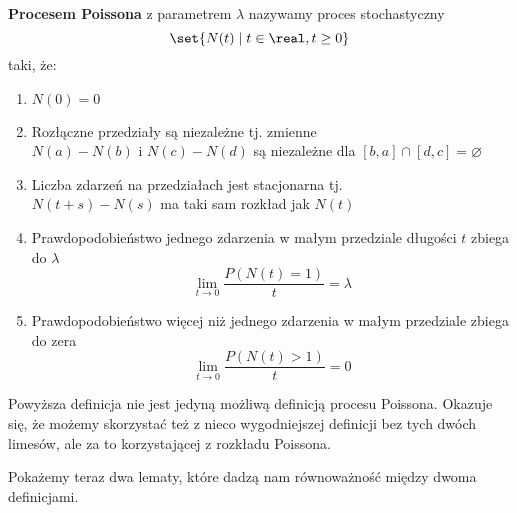 \begin{definition}
    \label{poisson-process-definition}
    \textbf{Procesem Poissona} z parametrem \( \lambda \) nazywamy proces stochastyczny
    \[ \set{N(t) \mid t \in \real, t \geq 0} \]
    taki, że:
    
    \begin{enumerate}
        \item \( N(0) = 0 \)
        
        \item Rozłączne przedziały są niezależne tj. zmienne \\
            \( N(a) - N(b) \) i \( N(c) - N(d) \) są niezależne dla \( [b, a] \cap [d, c] = \varnothing \)
        
        \item Liczba zdarzeń na przedziałach jest stacjonarna tj. \\
            \( N(t + s) - N(s) \) ma taki sam rozkład jak \( N(t) \)
            
        \item Prawdopodobieństwo jednego zdarzenia w małym przedziale długości \( t \) zbiega do \( \lambda  \) \\
            \[ \lim_{t \rightarrow 0} \frac{P(N(t) = 1)}{t} = \lambda \]
            
        \item Prawdopodobieństwo więcej niż jednego zdarzenia w małym przedziale zbiega do zera \\
             \[ \lim_{t \rightarrow 0} \frac{P(N(t) > 1)}{t} = 0 \]
    \end{enumerate}
\end{definition}

Powyższa definicja nie jest jedyną możliwą definicją procesu Poissona. Okazuje się, że możemy skorzystać też z nieco wygodniejszej definicji bez tych dwóch limesów, ale za to korzystającej z rozkładu Poissona.

Pokażemy teraz dwa lematy, które dadzą nam równoważność między dwoma definicjami.


